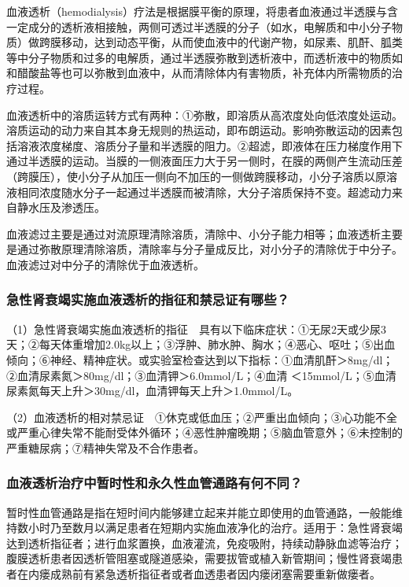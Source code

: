 血液透析（hemodialysis）疗法是根据膜平衡的原理，将患者血液通过半透膜与含一定成分的透析液相接触，两侧可透过半透膜的分子（如水，电解质和中小分子物质）做跨膜移动，达到动态平衡，从而使血液中的代谢产物，如尿素、肌酐、胍类等中分子物质和过多的电解质，通过半透膜弥散到透析液中，而透析液中的物质如
和醋酸盐等也可以弥散到血液中，从而清除体内有害物质，补充体内所需物质的治疗过程。

血液透析中的溶质运转方式有两种：①弥散，即溶质从高浓度处向低浓度处运动。溶质运动的动力来自其本身无规则的热运动，即布朗运动。影响弥散运动的因素包括溶液浓度梯度、溶质分子量和半透膜的阻力。②超滤，即液体在压力梯度作用下通过半透膜的运动。当膜的一侧液面压力大于另一侧时，在膜的两侧产生流动压差（跨膜压），使小分子从加压一侧向不加压的一侧做跨膜移动，小分子溶质以原溶液相同浓度随水分子一起通过半透膜而被清除，大分子溶质保持不变。超滤动力来自静水压及渗透压。

血液滤过主要是通过对流原理清除溶质，清除中、小分子能力相等；血液透析主要是通过弥散原理清除溶质，清除率与分子量成反比，对小分子的清除优于中分子。血液滤过对中分子的清除优于血液透析。

\subsubsection{急性肾衰竭实施血液透析的指征和禁忌证有哪些？}

（1）急性肾衰竭实施血液透析的指征　具有以下临床症状：①无尿2天或少尿3天；②每天体重增加2.0kg以上；③浮肿、肺水肿、胸水；④恶心、呕吐；⑤出血倾向；⑥神经、精神症状。或实验室检查达到以下指标：①血清肌酐＞8mg/dl；②血清尿素氮＞80mg/dl；③血清钾＞6.0mmol/L；④血清
＜15mmol/L；⑤血清尿素氮每天上升＞30mg/dl，血清钾每天上升＞1.0mmol/L。

（2）血液透析的相对禁忌证　①休克或低血压；②严重出血倾向；③心功能不全或严重心律失常不能耐受体外循环；④恶性肿瘤晚期；⑤脑血管意外；⑥未控制的严重糖尿病；⑦精神失常及不合作患者。

\subsubsection{血液透析治疗中暂时性和永久性血管通路有何不同？}

暂时性血管通路是指在短时间内能够建立起来并能立即使用的血管通路，一般能维持数小时乃至数月以满足患者在短期内实施血液净化的治疗。适用于：急性肾衰竭达到透析指征者；进行血浆置换，血液灌流，免疫吸附，持续动静脉血滤等治疗；腹膜透析患者因透析管阻塞或隧道感染，需要拔管或植入新管期间；慢性肾衰竭患者在内瘘成熟前有紧急透析指征者或者血透患者因内瘘闭塞需要重新做瘘者。

